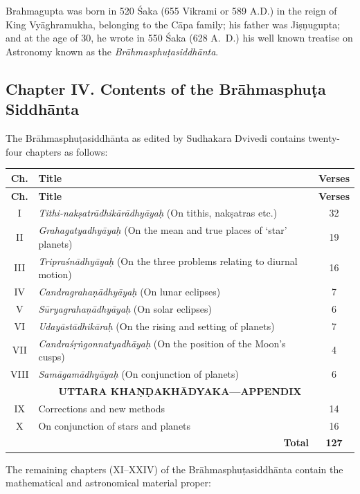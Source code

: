 \documentclass[11pt,a4paper]{article}
\begin{document}
Brahmagupta was born in 520 \'Saka (655 Vikrami or 589 A.D.) in the reign of King Vy\=aghramukha, belonging to the C\=apa family; his father was Jiṣṇugupta; and at the age of 30, he wrote in 550 \'Saka (628 A.\ D.) his well known treatise on Astronomy known as the \textit{Br\=ahmasphuṭasiddh\=anta}.

\subsection*{Chapter IV. Contents of the Br\=ahmasphuṭa Siddh\=anta}

The Br\=ahmasphuṭasiddh\=anta as edited by Sudhakara Dvivedi contains twenty-four chapters as follows:

\begin{longtable}{|c|p{8cm}|c|}
\hline
\textbf{Ch.} & \textbf{Title} & \textbf{Verses} \\
\hline
\endfirsthead
\hline
\textbf{Ch.} & \textbf{Title} & \textbf{Verses} \\
\hline
\endhead
I & \textit{Tithi-nakṣatr\=adhik\=ar\=adhy\=ayaḥ} (On tithis, nakṣatras etc.) & 32 \\
II & \textit{Grahagatyadhy\=ayaḥ} (On the mean and true places of `star' planets) & 19 \\
III & \textit{Tripra\'sn\=adhy\=ayaḥ} (On the three problems relating to diurnal motion) & 16 \\
IV & \textit{Candragrahaṇ\=adhy\=ayaḥ} (On lunar eclipses) & 7 \\
V & \textit{S\=uryagrahaṇ\=adhy\=ayaḥ} (On solar eclipses) & 6 \\
VI & \textit{Uday\=ast\=adhik\=araḥ} (On the rising and setting of planets) & 7 \\
VII & \textit{Candra\'sṛṅgonnatyadh\=ayaḥ} (On the position of the Moon's cusps) & 4 \\
VIII & \textit{Sam\=agam\=adhy\=ayaḥ} (On conjunction of planets) & 6 \\
\hline
\multicolumn{3}{|c|}{\textbf{UTTARA KHA\d N\d DAKH\=ADYAKA---APPENDIX}} \\
\hline
IX & Corrections and new methods & 14 \\
X & On conjunction of stars and planets & 16 \\
\hline
\multicolumn{2}{|r|}{\textbf{Total}} & \textbf{127} \\
\hline
\end{longtable}

The remaining chapters (XI--XXIV) of the Br\=ahmasphuṭasiddh\=anta contain the mathematical and astronomical material proper:
\end{document}
